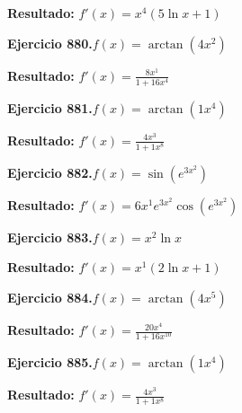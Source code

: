 \documentclass[10pt,a4paper]{article}
\begin{document}
\begin{solbox}
\textbf{Resultado:} \(\displaystyle f'(x) = x^{4}(5\ln x + 1)\)
\end{solbox}

\newpage
\begin{ejbox}
\textbf{Ejercicio 880.}\quad $f(x) = \arctan(4x^{2})$
\end{ejbox}

\begin{solbox}
\textbf{Resultado:} \(\displaystyle f'(x) = \frac{8x^{1}}{1+16x^{4}}\)
\end{solbox}

\begin{ejbox}
\textbf{Ejercicio 881.}\quad $f(x) = \arctan(1x^{4})$
\end{ejbox}

\begin{solbox}
\textbf{Resultado:} \(\displaystyle f'(x) = \frac{4x^{3}}{1+1x^{8}}\)
\end{solbox}

\begin{ejbox}
\textbf{Ejercicio 882.}\quad $f(x) = \sin(e^{3x^{2}})$
\end{ejbox}

\begin{solbox}
\textbf{Resultado:} \(\displaystyle f'(x) = 6x^{1}e^{3x^{2}}\cos(e^{3x^{2}})\)
\end{solbox}

\newpage
\begin{ejbox}
\textbf{Ejercicio 883.}\quad $f(x) = x^{2} \ln x$
\end{ejbox}

\begin{solbox}
\textbf{Resultado:} \(\displaystyle f'(x) = x^{1}(2\ln x + 1)\)
\end{solbox}

\begin{ejbox}
\textbf{Ejercicio 884.}\quad $f(x) = \arctan(4x^{5})$
\end{ejbox}

\begin{solbox}
\textbf{Resultado:} \(\displaystyle f'(x) = \frac{20x^{4}}{1+16x^{10}}\)
\end{solbox}

\begin{ejbox}
\textbf{Ejercicio 885.}\quad $f(x) = \arctan(1x^{4})$
\end{ejbox}

\begin{solbox}
\textbf{Resultado:} \(\displaystyle f'(x) = \frac{4x^{3}}{1+1x^{8}}\)
\end{solbox}
\end{document}
